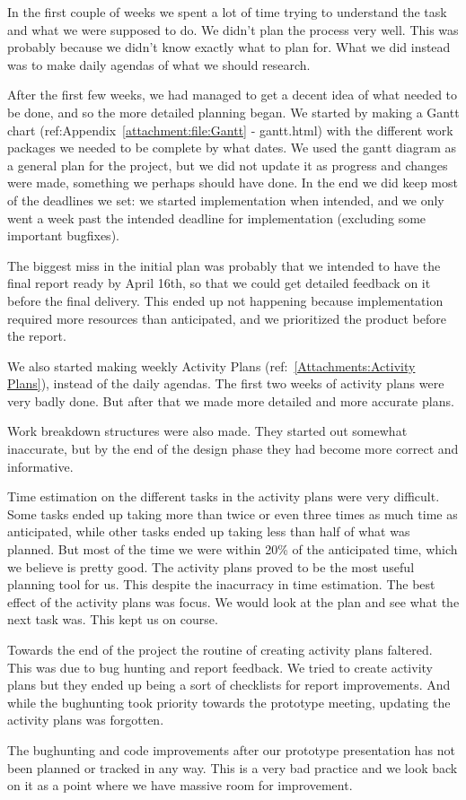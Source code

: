 In the first couple of weeks we spent a lot of time trying to understand the task and what we were supposed to do. We didn't plan the process very well. This was probably because we didn't know exactly what to plan for. What we did instead was to make daily agendas of what we should research.

After the first few weeks, we had managed to get a decent idea of what needed to be done, and so the more detailed planning began. We started by making a Gantt chart (ref:Appendix~\ref{attachment:file:Gantt} - gantt.html) with the different work packages we needed to be complete by what dates. We used the gantt diagram as a general plan for the project, but we did not update it as progress and changes were made, something we perhaps should have done. In the end we did keep most of the deadlines we set: we started implementation when intended, and we only went a week past the intended deadline for implementation (excluding some important bugfixes). 

The biggest miss in the initial plan was probably that we intended to have the final report ready by April 16th, so that we could get detailed feedback on it before the final delivery. This ended up not happening because implementation required more resources than anticipated, and we prioritized the product before the report.

We also started making weekly Activity Plans (ref:~\ref{Attachments:Activity Plans}), instead of the daily agendas. The first two weeks of activity plans were very badly done. But after that we made more detailed and more accurate plans.

Work breakdown structures were also made. They started out somewhat inaccurate, but by the end of the design phase they had become more correct and informative. 

Time estimation on the different tasks in the activity plans were very difficult. Some tasks ended up taking more than twice or even three times as much time as anticipated, while other tasks ended up taking less than half of what was planned. But most of the time we were within 20\% of the anticipated time, which we believe is pretty good. The activity plans proved to be the most useful planning tool for us. This despite the inacurracy in time estimation. The best effect of the activity plans was focus. We would look at the plan and see what the next task was. This kept us on course. 

Towards the end of the project the routine of creating activity plans faltered. This was due to bug hunting and report feedback. We tried to create activity plans but they ended up being a sort of checklists for report improvements. And while the bughunting took priority towards the prototype meeting, updating the activity plans was forgotten.
    
The bughunting and code improvements after our prototype presentation has not been planned or tracked in any way. This is a very bad practice and we look back on it as a point where we have massive room for improvement.

